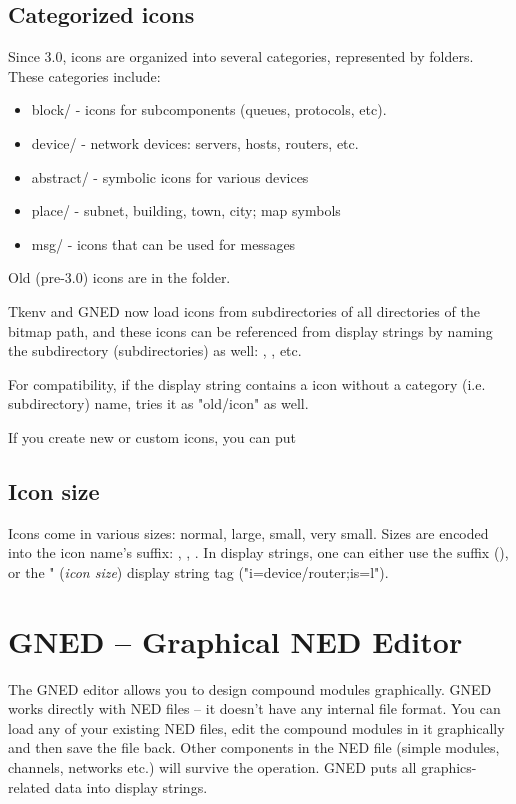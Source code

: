 \subsection{Categorized icons}

Since {\opp} 3.0, icons are organized into several categories, represented
by folders. These categories include:

\begin{itemize}
  \item block/ - icons for subcomponents (queues, protocols, etc).
  \item device/ - network devices: servers, hosts, routers, etc.
  \item abstract/ - symbolic icons for various devices
  \item place/ - subnet, building, town, city; map symbols
  \item msg/ - icons that can be used for messages
\end{itemize}

Old (pre-3.0) icons are in the  folder.

Tkenv and GNED now load icons from subdirectories of all directories
of the bitmap path, and these icons can be referenced from display strings
by naming the subdirectory (subdirectories) as well:
, , etc.

For compatibility, if the display string contains a icon without
a category (i.e. subdirectory) name, {\opp} tries it as "old/icon" as well.

If you create new or custom icons, you can put

\subsection{Icon size}

Icons come in various sizes: normal, large, small, very small. Sizes are
encoded into the icon name's suffix: , , .
In display strings, one can either use the suffix (),
or the " (\textit{icon size}) display string tag ("i=device/router;is=l").


\section{GNED -- Graphical NED Editor}


The GNED editor allows you to design compound modules graphically.
GNED works directly with NED files -- it doesn't have any internal file
format. You can load any of your existing NED files, edit the compound
modules in it graphically and then save the file back. Other components
in the NED file (simple modules, channels, networks etc.) will
survive the operation. GNED puts all graphics-related data into
display strings.

